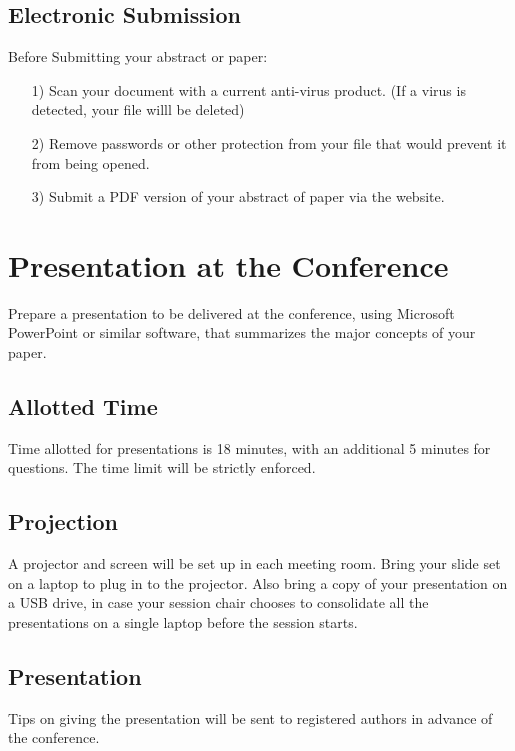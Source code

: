 \documentclass[twocolumn,letterpaper]{IEEEAerospaceCLS}  %
\begin{document}
\subsection{Electronic Submission}
Before Submitting your abstract or paper:
\begin{itemize}
  \item [1)] Scan your document with a current anti-virus product. (If a virus is detected, your file willl be deleted) \\
  \item [2)] Remove passwords or other protection from your file that would prevent it from being opened. \\
  \item [3)] Submit a PDF version of your abstract of paper via the website.
\end{itemize}

\section{Presentation at the Conference}
Prepare a presentation to be delivered at the conference, using Microsoft PowerPoint or similar software, that summarizes the major concepts of your paper.

\subsection{Allotted Time}
Time allotted for presentations is 18 minutes, with an additional 5 minutes for questions. The time limit will be strictly enforced.

\subsection{Projection}
A projector and screen will be set up in each meeting room. Bring your slide set on a laptop to plug in to the projector. Also bring a copy of your presentation on a USB drive, in case your session chair chooses to consolidate all the presentations on a single laptop before the session starts.

\subsection{Presentation}
Tips on giving the presentation will be sent to registered authors in advance of the conference.
\end{document}
